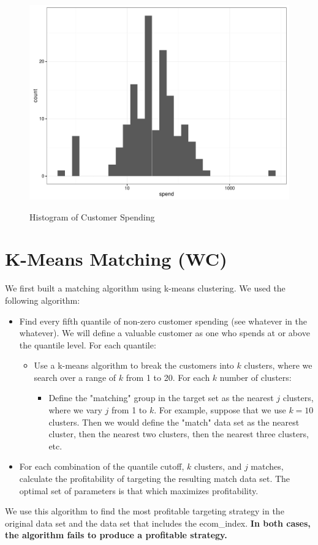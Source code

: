 \begin{figure}[!htb]
  \centering
  \caption{Histogram of Customer Spending}
  \includegraphics[scale=.5]{cust_spend_hist.pdf}
  \label{fig:cust_spend_hist}
\end{figure}


\section{K-Means Matching (WC)}

We first built a matching algorithm using k-means clustering. We used the following algorithm:
\begin{itemize}
\item Find every fifth quantile of non-zero customer spending (see whatever in the whatever). We will define a valuable customer as one who spends at or above the quantile level. For each quantile:
\begin{itemize}
\item Use a k-means algorithm to break the customers into $k$ clusters, where we search over a range of $k$ from 1 to 20. For each $k$ number of clusters:
\begin{itemize}
\item Define the "matching" group in the target set as the nearest $j$ clusters, where we vary $j$ from 1 to $k$. For example, suppose that we use $k=10$ clusters. Then we would define the "match" data set as the nearest cluster, then the nearest two clusters, then the nearest three clusters, etc.
\end{itemize}
\end{itemize}
\item For each combination of the quantile cutoff, $k$ clusters, and $j$ matches, calculate the profitability of targeting the resulting match data set. The optimal set of parameters is that which maximizes profitability.
\end{itemize}
We use this algorithm to find the most profitable targeting strategy in the original data set and the data set that includes the ecom\_index. \textbf{In both cases, the algorithm fails to produce a profitable strategy.}

